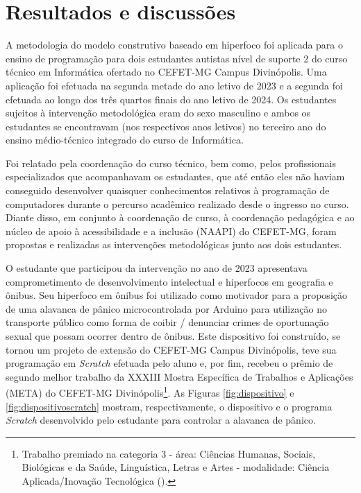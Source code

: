\documentclass[
  12pt,
  a4paper,
]{article}
\begin{document}
\section{Resultados e discussões}\label{sec:resultados}

A metodologia do modelo construtivo baseado em hiperfoco foi aplicada
para o ensino de programação para dois estudantes autistas nível de
suporte 2 do curso técnico em Informática ofertado no CEFET-MG Campus
Divinópolis. Uma aplicação foi efetuada na segunda metade do ano letivo
de 2023 e a segunda foi efetuada ao longo dos três quartos finais do ano
letivo de 2024. Os estudantes sujeitos à intervenção metodológica eram
do sexo masculino e ambos os estudantes se encontravam (nos respectivos
anos letivos) no terceiro ano do ensino médio-técnico integrado do curso
de Informática.

Foi relatado pela coordenação do curso técnico, bem como, pelos
profissionais especializados que acompanhavam os estudantes, que até
então eles não haviam conseguido desenvolver quaisquer conhecimentos
relativos à programação de computadores durante o percurso acadêmico
realizado desde o ingresso no curso. Diante disso, em conjunto à
coordenação de curso, à coordenação pedagógica e ao núcleo de apoio à
acessibilidade e a inclusão (NAAPI) do CEFET-MG, foram propostas e
realizadas as intervenções metodológicas junto aos dois estudantes.

O estudante que participou da intervenção no ano de 2023 apresentava
comprometimento de desenvolvimento intelectual e hiperfocos em geografia
e ônibus. Seu hiperfoco em ônibus foi utilizado como motivador para a
proposição de uma alavanca de pânico microcontrolada por Arduino para
utilização no transporte público como forma de coibir / denunciar crimes
de oportunação sexual que possam ocorrer dentro de ônibus. Este
dispositivo foi construído, se tornou um projeto de extensão do CEFET-MG
Campus Divinópolis, teve sua programação em \emph{Scratch} efetuada pelo
aluno e, por fim, recebeu o prêmio de segundo melhor trabalho da XXXIII
Mostra Específica de Trabalhos e Aplicações (META) do CEFET-MG
Divinópolis\footnote{Trabalho premiado na categoria 3 - área: Ciências
  Humanas, Sociais, Biológicas e da Saúde, Linguística, Letras e Artes -
  modalidade: Ciência Aplicada/Inovação Tecnológica
  ().}. As
Figuras \ref{fig:dispositivo} e \ref{fig:dispositivoscratch} mostram,
respectivamente, o dispositivo e o programa \emph{Scratch} desenvolvido
pelo estudante para controlar a alavanca de pânico.
\end{document}
